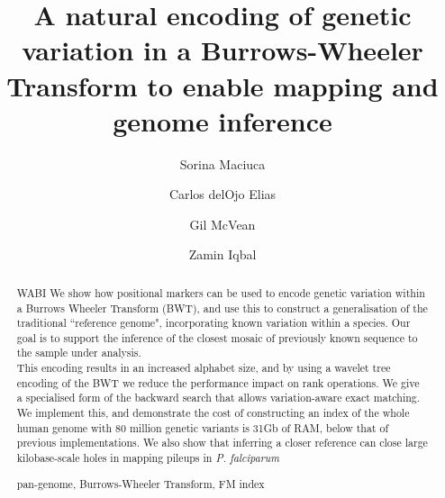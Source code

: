 \documentclass[runningheads,a4paper]{llncs}
\newcommand{\keywords}[1]{\par\addvspace\baselineskip
\noindent\keywordname\enspace\ignorespaces#1}
\begin{document}
\mainmatter  %

\title{A natural encoding of genetic variation in a Burrows-Wheeler Transform  to enable mapping and genome inference}


%
%
\author{Sorina Maciuca%
\and Carlos delOjo Elias\and Gil McVean \and Zamin Iqbal}
%



\maketitle


\begin{abstract} WABI
We show how positional markers can be used to encode genetic variation within a Burrows Wheeler Transform (BWT), and use this to construct a generalisation of the traditional ``reference genome", incorporating known variation within a species. Our goal is to support the inference of the closest mosaic of previously known sequence to the sample under analysis.\\ This encoding results in an increased alphabet size, and by using a wavelet tree encoding of the BWT we reduce the performance impact on rank operations. We give a specialised form of the backward search that allows variation-aware exact matching. We implement this, and demonstrate the cost of constructing an index of the whole human genome with 80 million genetic variants is 31Gb of RAM,  below that of previous implementations. We also show that inferring a closer reference can close large kilobase-scale holes in mapping pileups in \textit{P. falciparum}
\keywords{pan-genome, Burrows-Wheeler Transform, FM index}
\end{abstract}
\end{document}

